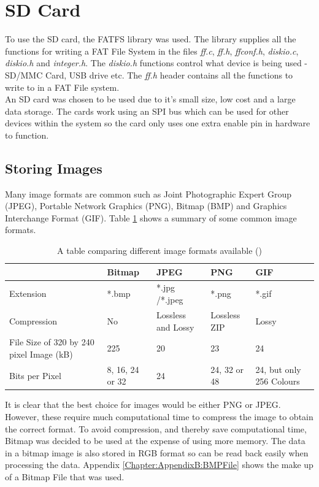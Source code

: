 \section{SD Card} 
To use the SD card, the FATFS library \cite{FATFS} was used. The library supplies all the functions for writing a FAT File System in the files \textit{ff.c}, \textit{ff.h}, \textit{ffconf.h}, \textit{diskio.c}, \textit{diskio.h} and \textit{integer.h}. The \textit{diskio.h} functions control what device is being used - SD/MMC Card, USB drive etc. The \textit{ff.h} header contains all the functions to write to in a FAT File system. 
\\
An SD card was chosen to be used due to it's small size, low cost and a large data storage. The cards work using an SPI bus which can be used for other devices within the system so the card only uses one extra enable pin in hardware to function. 

\subsection{Storing Images}

Many image formats are common such as Joint Photographic Expert Group (JPEG), Portable Network Graphics (PNG), Bitmap (BMP) and Graphics Interchange Format (GIF). Table \ref{ImageFormats} shows a summary of some common image formats.


\begin{table}
\centering
\begin{tabular}{|p{3cm}| p{3cm}|p{3cm}|p{3cm}|p{3cm}|} \hline
			&	Bitmap 		& 	JPEG			 	&	PNG				& 	GIF \\ \hline
Extension 		& 	*.bmp 		&  	*.jpg /*.jpeg 		& 	*.png				& 	*.gif \\ \hline
Compression 	& 	No 			& 	Lossless  and Lossy		&	Lossless ZIP			&	Lossy	\\\hline
File Size of 320 by 
240 pixel Image (kB) &	225			&	20				&	23				&	24 \\\hline
Bits per Pixel		&	8, 16, 24 or 32	&	24				&	24, 32 or 48 			& 	24, but only 256 Colours \\


\hline
\end{tabular}
\caption{A table comparing different image formats available (\cite{ImageComparison})}
\label{ImageFormats}
\end{table}

It is clear that the best choice for images would be either PNG or JPEG. However, these require much computational time to compress the image to obtain the correct format. To avoid compression, and thereby save computational time, Bitmap was decided to be used at the expense of using more memory. The data in a bitmap image is also stored in RGB format so can be read back easily when processing the data. Appendix \ref{Chapter:AppendixB:BMPFile} shows the make up of a Bitmap File that was used.

